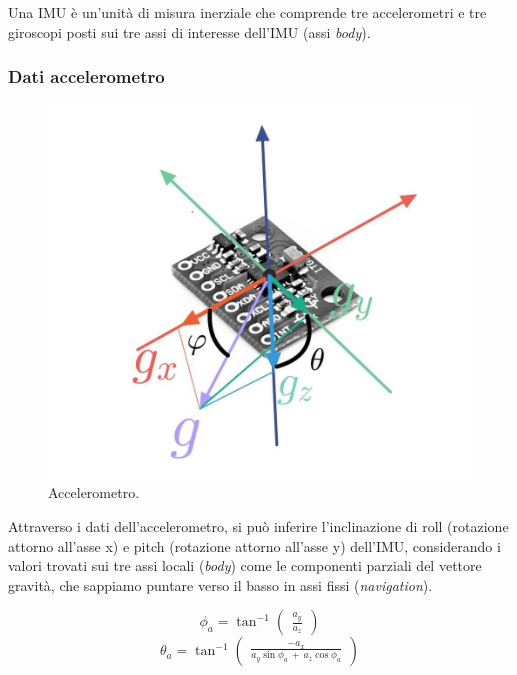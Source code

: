 Una IMU è un'unità di misura inerziale che comprende tre accelerometri e tre giroscopi posti sui tre assi di interesse dell'IMU (assi \textit{body}).

\subsubsection{Dati accelerometro}\label{Dati accelerometro}

\begin{figure}[H]
    \includegraphics[scale=0.35]{immagini/IMU_sdr_g.jpg}
    \centering
    \caption{Accelerometro.}
\end{figure}

Attraverso i dati dell'accelerometro, si può inferire l'inclinazione di roll (rotazione attorno all'asse x) e pitch (rotazione attorno all'asse y) dell'IMU, considerando i valori trovati sui tre assi locali (\textit{body}) come le componenti parziali del vettore gravità, che sappiamo puntare verso il basso in assi fissi (\textit{navigation}).

\begin{equation}\label{eq phi roll acc}
    \phi_a = \tan^{-1} \begin{pmatrix} \frac{a_y}{a_z} \end{pmatrix}
\end{equation}
\begin{equation}\label{eq theta pitch acc}
    \theta_a = \tan^{-1} \begin{pmatrix} \frac{-a_x}{a_y \sin{\phi_a} \, + \, a_z \cos{\phi_a}} \end{pmatrix}
\end{equation}


